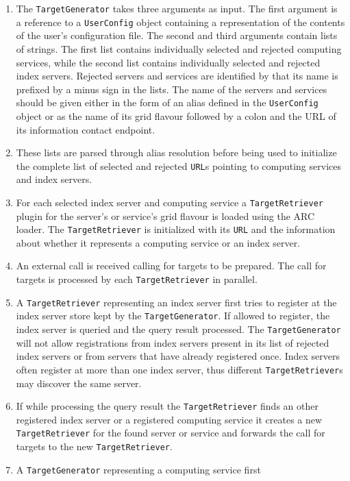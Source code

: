 \documentclass{book}
\newcommand{\TargetGenerator}{\texttt{TargetGenerator}}
\newcommand{\TargetRetriever}{\texttt{TargetRetriever}}
\newcommand{\URL}{\texttt{URL}}
\newcommand{\UserConfig}{\texttt{UserConfig}}
\begin{document}
\begin{enumerate}
\item{The {\TargetGenerator} takes three arguments as input. The first
  argument is a reference to a {\UserConfig} object containing a
  representation of the contents of the user's configuration file. The
  second and third arguments contain lists of strings. The first list
  contains individually selected and rejected computing services,
  while the second list contains individually selected and rejected
  index servers. Rejected servers and services are identified by that
  its name is prefixed by a minus sign in the lists. The name of the
  servers and services should be given either in the form of an alias
  defined in the {\UserConfig} object or as the name of its grid
  flavour followed by a colon and the URL of its information contact
  endpoint.}
\item{These lists are parsed through alias resolution before being
  used to initialize the complete list of selected and rejected
  {\URL}s pointing to computing services and index servers.}
\item{For each selected index server and computing service a
  {\TargetRetriever} plugin for the server's or service's grid flavour
  is loaded using the ARC loader. The {\TargetRetriever} is
  initialized with its {\URL} and the information about whether it
  represents a computing service or an index server.}
\item{An external call is received calling for targets to be
  prepared. The call for targets is processed by each
  {\TargetRetriever} in parallel.}
\item{A {\TargetRetriever} representing an index server first tries to
  register at the index server store kept by the {\TargetGenerator}.
  If allowed to register, the index server is queried and the query
  result processed. The {\TargetGenerator} will not allow
  registrations from index servers present in its list of rejected
  index servers or from servers that have already registered
  once. Index servers often register at more than one index server,
  thus different {\TargetRetriever}s may discover the same server.}
\item{If while processing the query result the {\TargetRetriever}
  finds an other registered index server or a registered computing
  service it creates a new {\TargetRetriever} for the found server or
  service and forwards the call for targets to the new
  {\TargetRetriever}.}
\item{A {\TargetGenerator} representing a computing service first
}
\end{enumerate}
\end{document}
